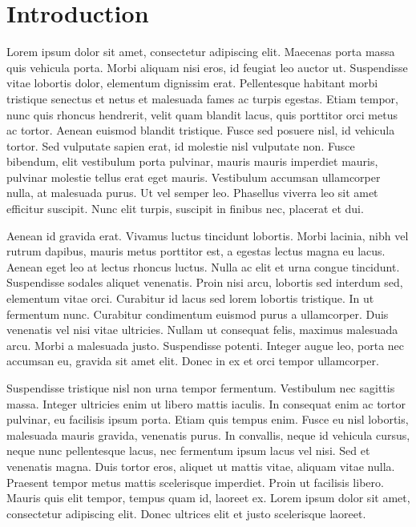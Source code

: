 \documentclass{article}
\begin{document}
\section{Introduction}

Lorem ipsum dolor sit amet, consectetur adipiscing elit. Maecenas porta massa quis vehicula porta. Morbi aliquam nisi eros, id feugiat leo auctor ut. Suspendisse vitae lobortis dolor, elementum dignissim erat. Pellentesque habitant morbi tristique senectus et netus et malesuada fames ac turpis egestas. Etiam tempor, nunc quis rhoncus hendrerit, velit quam blandit lacus, quis porttitor orci metus ac tortor. Aenean euismod blandit tristique. Fusce sed posuere nisl, id vehicula tortor. Sed vulputate sapien erat, id molestie nisl vulputate non. Fusce bibendum, elit vestibulum porta pulvinar, mauris mauris imperdiet mauris, pulvinar molestie tellus erat eget mauris. Vestibulum accumsan ullamcorper nulla, at malesuada purus. Ut vel semper leo. Phasellus viverra leo sit amet efficitur suscipit. Nunc elit turpis, suscipit in finibus nec, placerat et dui.

Aenean id gravida erat. Vivamus luctus tincidunt lobortis. Morbi lacinia, nibh vel rutrum dapibus, mauris metus porttitor est, a egestas lectus magna eu lacus. Aenean eget leo at lectus rhoncus luctus. Nulla ac elit et urna congue tincidunt. Suspendisse sodales aliquet venenatis. Proin nisi arcu, lobortis sed interdum sed, elementum vitae orci. Curabitur id lacus sed lorem lobortis tristique. In ut fermentum nunc. Curabitur condimentum euismod purus a ullamcorper. Duis venenatis vel nisi vitae ultricies. Nullam ut consequat felis, maximus malesuada arcu. Morbi a malesuada justo. Suspendisse potenti. Integer augue leo, porta nec accumsan eu, gravida sit amet elit. Donec in ex et orci tempor ullamcorper.

Suspendisse tristique nisl non urna tempor fermentum. Vestibulum nec sagittis massa. Integer ultricies enim ut libero mattis iaculis. In consequat enim ac tortor pulvinar, eu facilisis ipsum porta. Etiam quis tempus enim. Fusce eu nisl lobortis, malesuada mauris gravida, venenatis purus. In convallis, neque id vehicula cursus, neque nunc pellentesque lacus, nec fermentum ipsum lacus vel nisi. Sed et venenatis magna. Duis tortor eros, aliquet ut mattis vitae, aliquam vitae nulla. Praesent tempor metus mattis scelerisque imperdiet. Proin ut facilisis libero. Mauris quis elit tempor, tempus quam id, laoreet ex. Lorem ipsum dolor sit amet, consectetur adipiscing elit. Donec ultrices elit et justo scelerisque laoreet.
\end{document}
